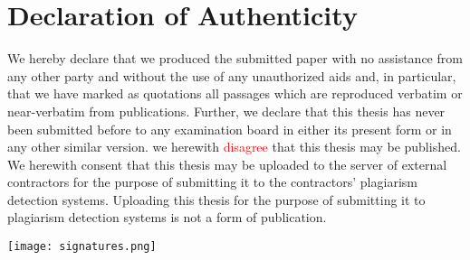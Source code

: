 \newpage
{} %

\section*{%
	Declaration of Authenticity}
We hereby declare that we produced the submitted paper with no assistance from any other party and without the use of any unauthorized aids and, in particular, that we have marked as quotations all passages which are reproduced verbatim or near-verbatim from publications. Further, we declare that this thesis has never been submitted before to any examination board in either its present form or in any other similar version. we herewith \textcolor{red}{disagree} that this thesis may be published. We herewith consent that this thesis may be uploaded to the server of external contractors for the purpose of submitting it to the contractors’ plagiarism detection systems. Uploading this thesis for the purpose of submitting it to plagiarism detection systems is not a form of publication.



\vspace{5cm}

\texttt{[image: signatures.png]}
